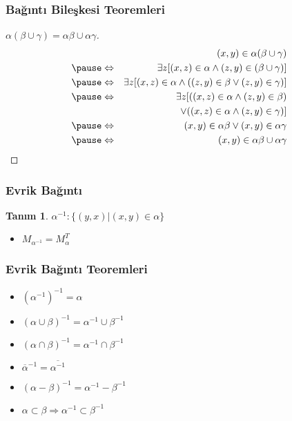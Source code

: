 \documentclass[dvipsnames]{beamer}
\theoremstyle{definition}
\newtheorem{tanim}[theorem]{Tanım}
\theoremstyle{example}
\theoremstyle{plain}
\begin{document}
\begin{frame}
  \frametitle{Bağıntı Bileşkesi Teoremleri}

  \begin{proof}[$\alpha (\beta \cup \gamma) = \alpha \beta \cup \alpha \gamma$]
    \begin{eqnarray*}
      &                 & (x,y) \in \alpha (\beta \cup \gamma)\\\pause
      & \Leftrightarrow & \exists z [(x,z) \in \alpha
                              \wedge (z,y) \in (\beta \cup \gamma)]\\\pause
      & \Leftrightarrow & \exists z [(x,z) \in \alpha
                             \wedge ((z,y) \in \beta
                                \vee (z,y) \in \gamma)]\\\pause
      & \Leftrightarrow & \exists z [((x,z) \in \alpha \wedge (z,y) \in \beta)\\
      &                 &     ~~\vee ((x,z) \in \alpha \wedge (z,y) \in \gamma)]\\\pause
      & \Leftrightarrow & (x,y) \in \alpha \beta \vee (x,y) \in \alpha \gamma\\\pause
      & \Leftrightarrow & (x,y) \in \alpha \beta \cup \alpha \gamma
    \end{eqnarray*}
  \end{proof}
\end{frame}

\begin{frame}
  \frametitle{Evrik Bağıntı}

  \begin{tanim}
    $\alpha^{-1}: \{(y,x) | (x,y) \in \alpha \}$
  \end{tanim}

  \begin{itemize}
    \item $M_{\alpha^{-1}} = M_{\alpha}^T$
  \end{itemize}
\end{frame}

\begin{frame}
  \frametitle{Evrik Bağıntı Teoremleri}

  \begin{itemize}
    \item $(\alpha^{-1})^{-1} = \alpha$

    \pause
    \item $(\alpha \cup \beta)^{-1} = \alpha^{-1} \cup \beta^{-1}$

    \pause
    \item $(\alpha \cap \beta)^{-1} = \alpha^{-1} \cap \beta^{-1}$

    \pause
    \item $\overline{\alpha}^{-1} = \overline{\alpha^{-1}}$

    \pause
    \item $(\alpha - \beta)^{-1} = \alpha^{-1} - \beta^{-1}$

    \pause
    \item $\alpha \subset \beta \Rightarrow \alpha^{-1} \subset \beta^{-1}$
  \end{itemize}
\end{frame}
\end{document}
